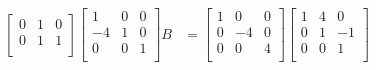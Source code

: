 \documentclass[12pt,letterpaper]{article}
\begin{document}
\begin{enumerate}
\begin{enumerate}
\begin{align*}
\begin{bmatrix}
               0 &  1 &  0 \\
               0 &  1 &  1 \\
            \end{bmatrix}
            \begin{bmatrix}
               1 &  0 &  0 \\
              -4 &  1 &  0 \\
               0 &  0 &  1 \\
            \end{bmatrix}
            B
            &=
            \begin{bmatrix}
               1 &  0 &  0 \\
               0 & -4 &  0 \\
               0 &  0 &  4 \\
            \end{bmatrix}
            \begin{bmatrix}
               1 &  4 &  0 \\
               0 &  1 & -1 \\
               0 &  0 &  1 \\
            \end{bmatrix}
            \\
          \end{align*}


\end{enumerate}
\end{enumerate}
\end{document}

